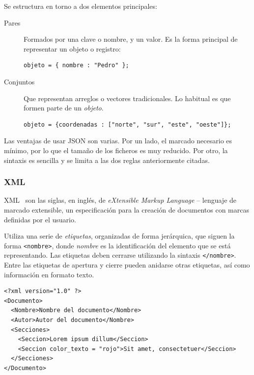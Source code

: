 Se estructura en torno a dos elementos principales:
\begin{description}
\item[Pares] Formados por una clave o nombre, y un valor. Es la forma principal
  de representar un objeto o registro:
  \begin{verbatim}
objeto = { nombre : "Pedro" };    
  \end{verbatim}
\item[Conjuntos] Que representan arreglos o vectores tradicionales. Lo habitual
  es que formen parte de un \textit{objeto}.
  \begin{verbatim}
objeto = {coordenadas : ["norte", "sur", "este", "oeste"]};
  \end{verbatim}
\end{description}

Las ventajas de usar JSON son varias. Por un lado, el marcado necesario es
mínimo, por lo que el tamaño de los ficheros es muy reducido. Por otro, la
sintaxis es sencilla y se limita a las dos reglas anteriormente citadas.

\subsubsection{XML}
\label{sec:diseno_xml}
XML~\cite{XMLSpec} son las siglas, en inglés, de \textit{eXtensible Markup
  Language} -- lenguaje de marcado extensible, un especificación para la
creación de documentos con marcas definidas por el usuario.

Utiliza una serie de \textit{etiquetas}, organizadas de forma jerárquica, que
siguen la forma \texttt{<nombre>}, donde \textit{nombre} es la identificación
del elemento que se está representando. Las etiquetas deben cerrarse utilizando
la sintaxis \texttt{</nombre>}. Entre las etiquetas de apertura y cierre pueden
anidarse otras etiquetas, así como información en formato texto.

\begin{verbatim}
<?xml version="1.0" ?>
<Documento>
  <Nombre>Nombre del documento</Nombre>
  <Autor>Autor del documento</Nombre>
  <Secciones>
    <Seccion>Lorem ipsum dillum</Seccion>
    <Seccion color_texto = "rojo">Sit amet, consectetuer</Seccion>
  </Secciones>
</Documento>  
\end{verbatim}

